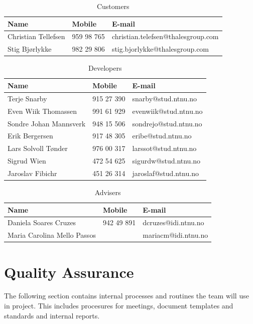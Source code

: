 \begin{table}[!ht] \footnotesize \center
\caption{Customers\label{tab:part_cust}}
\begin{tabular}{l l l}
	\toprule
	Name & Mobile & E-mail \\ 
	\midrule
	Christian Tellefsen & 959 98 765 & christian.telefsen@thalesgroup.com \\ 
	Stig Bjørlykke & 982 29 806 & stig.bjorlykke@thalesgroup.com \\ 
	\bottomrule
\end{tabular}
\end{table}

\begin{table}[!ht] \footnotesize \center
\caption{Developers\label{tab:part_dev}}
\begin{tabular}{l l l}
	\toprule
	Name & Mobile & E-mail  \\ 
	\midrule
	Terje Snarby & 915 27 390 & snarby@stud.ntnu.no \\ 
	Even Wiik Thomassen & 991 61 929 & evenwiik@stud.ntnu.no \\ 
	Sondre Johan Mannsverk & 948 15 506 & sondrejo@stud.ntnu.no \\ 
	Erik Bergersen & 917 48 305 & eribe@stud.ntnu.no \\ 
	Lars Solvoll Tønder & 976 00 317 & larssot@stud.ntnu.no \\ 
	Sigrud Wien & 472 54 625 & sigurdw@stud.ntnu.no \\ 
	Jaroslav Fibichr & 451 26 314 & jaroslaf@stud.ntnu.no \\ 
	\bottomrule
\end{tabular}
\end{table}

\begin{table}[!ht] \footnotesize \center
\caption{Advisers\label{tab:part_adv}}
\begin{tabular}{l l l}
	\toprule
	Name & Mobile & E-mail  \\ 
	\midrule
	Daniela Soares Cruzes & 942 49 891 & dcruzes@idi.ntnu.no \\ 
	Maria Carolina Mello Passos & & mariacm@idi.ntnu.no \\ 
	\bottomrule
\end{tabular}
\end{table}


\section{Quality Assurance}
The following section contains internal processes and routines the team will use in project. This includes procesures for meetings, document templates and standards and internal reports.


